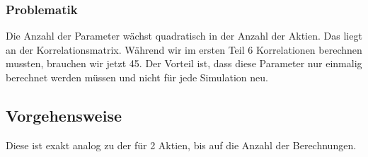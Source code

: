 \documentclass[12pt]{article}
\begin{document}
\subsubsection{Problematik}

Die Anzahl der Parameter wächst quadratisch in der Anzahl der Aktien. Das liegt an der Korrelationsmatrix. Während wir im ersten Teil 6 Korrelationen berechnen mussten, brauchen wir jetzt 45. Der Vorteil ist, dass diese Parameter nur einmalig berechnet werden müssen und nicht für jede Simulation neu.


\subsection{Vorgehensweise}

Diese ist exakt analog zu der für 2 Aktien, bis auf die Anzahl der Berechnungen.
\end{document}
